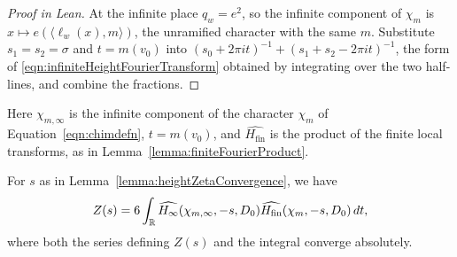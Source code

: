 \begin{proof}[Proof in Lean]

\leanok


At the infinite place $q_w=e^2$, so the infinite component of $\chi_m$ is $x\mapsto e(\langle\ell_w(x),m\rangle)$, the unramified character with the same $m$. Substitute $s_1=s_2=\sigma$ and $t=m(v_0)$ into $(s_0+2\pi it)^{-1}+(s_1+s_2-2\pi it)^{-1}$, the form of \eqref{eqn:infiniteHeightFourierTransform} obtained by integrating over the two half-lines, and combine the fractions.

\end{proof}

\begin{lemma}

\label{lemma:poissonIntegral}


\leanok

Here $\chi_{m,\infty}$ is the infinite component of the character $\chi_m$ of Equation~\ref{eqn:chimdefn}, $t=m(v_0)$, and $\widehat{H_{\mathrm{fin}}}$ is the product of the finite local transforms, as in Lemma~\ref{lemma:finiteFourierProduct}.

 For $s$ as in Lemma~\ref{lemma:heightZetaConvergence}, we have \begin{equation*} Z(s)=6\int_{\mathbb{R}} \widehat{H_\infty}(\chi_{m,\infty},-s,D_0) \widehat{H_{\mathrm{fin}}}(\chi_m,-s,D_0)\,dt, \end{equation*} where both the series defining $Z(s)$ and the integral converge absolutely. 

\end{lemma}

